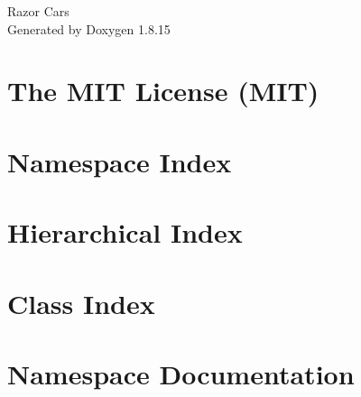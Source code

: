 \let\mypdfximage\pdfximage\def\pdfximage{\immediate\mypdfximage}\documentclass[twoside]{book}
\newcommand{\+}{\discretionary{\mbox{\scriptsize$\hookleftarrow$}}{}{}}
\newcommand{\clearemptydoublepage}{%
  \newpage{\pagestyle{empty}\cleardoublepage}%
}
\begin{document}
\hypersetup{pageanchor=false,
             bookmarksnumbered=true,
             pdfencoding=unicode
            }
\begin{titlepage}
\vspace*{7cm}
\begin{center}%
{\Large Razor Cars }\\
\vspace*{1cm}
{\large Generated by Doxygen 1.8.15}\\
\end{center}
\end{titlepage}
\clearemptydoublepage
{}
\tableofcontents
\clearemptydoublepage
{}
\hypersetup{pageanchor=true}

\chapter{The M\+IT License (M\+IT)}
\label{md__c_1__users__e_a_s_j_source_repos__razor_cars__razor_cars_wwwroot_lib_jquery-validation__l_i_c_e_n_s_e}

\chapter{Namespace Index}

\chapter{Hierarchical Index}

\chapter{Class Index}

\chapter{Namespace Documentation}








\end{document}
